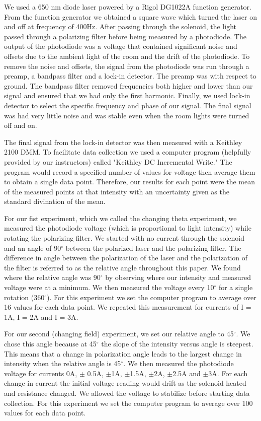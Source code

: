 \documentclass[prb,preprint]{revtex4-1}
\begin{document}
We used a 650 nm diode laser powered by a Rigol DG1022A function generator. From the function generator we obtained a square wave which turned the laser on and off at frequency of 400Hz. After passing through the solenoid, the light passed through a polarizing filter before being measured by a photodiode. The output of the photodiode was a voltage that contained significant noise and offsets due to the ambient light of the room and the drift of the photodiode.  To remove the noise and offsets, the signal from the photodiode was run through a preamp, a bandpass filter and a lock-in detector. The preamp was with respect to ground. The bandpass filter removed frequencies both higher and lower than our signal and ensured that we had only the first harmonic. Finally, we used lock-in detector to select the specific frequency and phase of our signal. The final signal was had very little noise and was stable even when the room lights were turned off and on.

The final signal from the lock-in detector was then measured with a Keithley 2100 DMM. To facilitate data collection we used a computer program (helpfully provided by our instructors) called "Keithley DC Incremental Write." The program would record a specified number of values for voltage then average them to obtain a single data point. Therefore, our results for each point were the mean of the measured points at that intensity with an uncertainty given as the standard divination of the mean. 

For our fist experiment, which we called the changing theta experiment, we measured the photodiode voltage (which is proportional to light intensity) while rotating the polarizing filter. We started with no current through the solenoid and an angle of 90$^{\circ}$ between the polarized laser and the polarizing filter. The difference in angle between the polarization of the laser and the polarization of the filter is referred to as the relative angle throughout this paper. We found where the relative angle was 90$^{\circ}$ by observing where our intensity and measured voltage were at a minimum. We then measured the voltage every 10$^{\circ}$ for a single rotation (360$^{\circ}$). For this experiment we set the computer program to average over 16 values for each data point. We repeated this measurement for currents of I = 1A, I = 2A and I = 3A. 

For our second (changing field) experiment, we set our relative angle to 45$^{\circ}$. We chose this angle because at 45$^{\circ}$ the slope of the intensity versus angle is steepest. This means that a change in polarization angle leads to the largest change in intensity when the relative angle is 45$^{\circ}$. We then measured the photodiode voltage for currents 0A, $\pm$ 0.5A, $\pm$1A, $\pm$1.5A, $\pm$2A, $\pm$2.5A and $\pm$3A. For each change in current the initial voltage reading would drift as the solenoid heated and resistance changed. We allowed the voltage to stabilize before starting data collection. For this experiment we set the computer program to average over 100 values for each data point.
\end{document}
